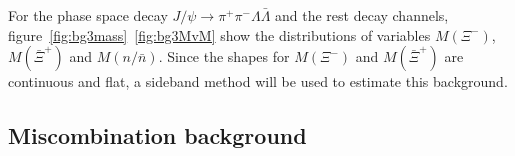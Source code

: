 For the phase space decay $J/\psi \to \pi^+\pi^- \Lambda \bar{\Lambda}$
and the rest decay channels, figure~\ref{fig:bg3mass}~\ref{fig:bg3MvM} 
show the distributions
of variables $M(\Xi^-)$, $M(\bar{\Xi}^+)$ and $M(n/\bar{n})$. Since the 
shapes for $M(\Xi^-)$ and $M(\bar{\Xi}^+)$ are continuous and flat, a 
sideband method will be used to estimate this background.



\subsection{Miscombination background}

